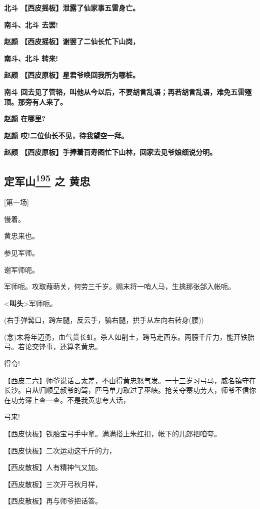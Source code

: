 \textbf{北斗 【西皮摇板】泄露了仙家事五雷身亡。}

\textbf{南斗、北斗 去罢!}

\textbf{赵颜 【西皮摇板】谢罢了二仙长忙下山岗，}

\textbf{南斗、北斗 转来!}

\textbf{赵颜 【西皮原板】星君爷唤回我所为哪桩。}

\textbf{南斗
回去见了管辂，叫他从今以后，不要胡言乱语；再若胡言乱语，难免五雷殛顶。那旁有人来了。}

\textbf{赵颜 在哪里?}

\textbf{赵颜 哎!二位仙长不见，待我望空一拜。}

\textbf{赵颜 【西皮原板】手捧着百寿图忙下山林，回家去见爷娘细说分明。}

\hypertarget{ux5b9aux519bux5c71-ux4e4b-ux9ec4ux5fe0}{%
\subsection{\texorpdfstring{定军山\protect\hyperlink{fn195}{\textsuperscript{195}}
之
黄忠}{定军山195 之 黄忠}}\label{ux5b9aux519bux5c71-ux4e4b-ux9ec4ux5fe0}}

{[}第一场{]}

慢着。

黄忠来也。

参见军师。

谢军师呃。

军师呃。攻取葭萌关，何劳三千岁。赐末将一哨人马，生擒那张郃入帐呃。

\textless{}\textbf{叫头}\textgreater{}军师呃。

(右手弹髯口，跨左腿，反云手，骗右腿，拱手从左向右转身(腰))

(念)末将年迈勇，血气贯长虹。杀人如削土，跨马走西东。两膀千斤力，能开铁胎弓。若论交锋事，还算老黄忠。

得令!

【西皮二六】师爷说话言太差，不由得黄忠怒气发。一十三岁习弓马，威名镇守在长沙。自从归顺皇叔爷的驾，匹马单刀取过了巫峡。抢关夺寨功劳大，师爷不信你在功劳簿上查一查。不是我黄忠夸大话，

弓来!

【西皮快板】铁胎宝弓手中拿。满满搭上朱红扣，帐下的儿郎把咱夸。

【西皮快板】二次运动这千斤的力，

【西皮散板】人有精神气又加。

【西皮散板】三次开弓秋月样，

【西皮散板】再与师爷把话答。

